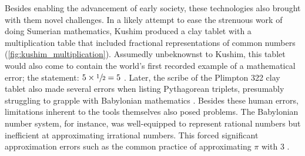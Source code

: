 Besides enabling the advancement of early society, these technologies also brought with them novel challenges. 
In a likely attempt to ease the strenuous work of doing Sumerian mathematics, Kushim produced a clay tablet with a multiplication table that included fractional representations of common numbers (\cref{fig:kushim_multiplication}). Assumedly unbeknownst to Kushim, this tablet would also come to contain the world's first recorded example of a mathematical error; the statement: $5 \times \sfrac{1}{2} = 5$ \parencite{nissen_archaic_1993}. 
Later, the scribe of the Plimpton 322 clay tablet also made several errors when listing Pythagorean triplets, presumably struggling to grapple with Babylonian mathematics \parencite{neugebauer_mathematical_1945,britton_plimpton_2011,cuneiformdigitallibraryinitiativecdli_mct_2005}. 
Besides these human errors, limitations inherent to the tools themselves also posed problems. 
The Babylonian number system, for instance, was well-equipped to represent rational numbers but inefficient at approximating irrational numbers. 
This forced significant approximation errors such as the common practice of approximating $\pi$ with 3 \parencite{georges_universal_2001}. 



